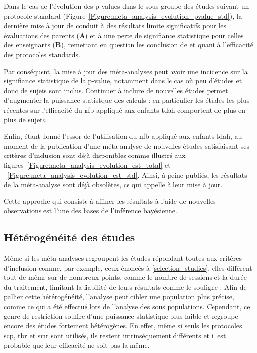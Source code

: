 \begin{itemize}
Dans le cas de l'évolution des p-values dans le sous-groupe des études suivant un protocole standard (Figure~\ref{Figure:meta_analysis_evolution_pvalue_std}), la dernière mise à jour 
de \citet{Cortese2016} conduit à des résultats limite significatifs pour les évaluations des parents (\textbf{A}) et à une perte de signifiance statistique pour celles des 
enseignants (\textbf{B}), remettant en question les conclusion de \citet{Cortese2016} et \citet{Bussalb2019clinical} quant à l'efficacité des protocoles standards.

Par conséquent, la mise à jour des méta-analyses peut avoir une incidence sur la signifiance statistique de la p-value, notamment dans le cas où peu d'études et donc de sujets
sont inclus. Continuer à inclure de nouvelles études permet d'augmenter la puissance statistque des calculs : en particulier les études les plus récentes sur l'efficacité du \gls{nfb}
appliqué aux enfants \gls{tdah} comportent de plus en plus de sujets.

Enfin, étant donné l'essor de l'utilisation du \gls{nfb} appliqué aux enfants \gls{tdah}, au moment de la publication d'une méta-analyse de nouvelles études satisfaisant ses critères d'inclusion
sont déjà disponibles comme illustré aux figures~\ref{Figure:meta_analysis_evolution_est_total} et ~\ref{Figure:meta_analysis_evolution_est_std}. Ainsi, à peine publiés, les résultats de la 
méta-analyse sont déjà obsolètes, ce qui appelle à leur mise à jour. 

Cette approche qui consiste à affiner les résultats à l'aide de nouvelles observations est l'une des bases de l'inférence bayésienne.

\subsection{Hétérogénéité des études} 

Même si les méta-analyses regroupent les études répondant toutes aux critères d'inclusion comme, par exemple, ceux énoncés à \ref{selection_studies}, 
elles diffèrent tout de même sur de nombreux points, comme le nombre de sessions et la durée du traitement, limitant la fiabilité de leurs résultats 
comme le souligne \citep{Alkoby2017}. Afin de pallier 
cette hétérogénéité, l'analyse peut cibler une population plus précise, comme ce qui a été effectué lors de l'analyse
des sous populations. Cependant, ce genre de restriction souffre d'une puissance statistique plus faible et regroupe encore des études fortement hétérogènes.
En effet, même si seuls les protocoles \gls{scp}, \gls{tbr} et \gls{smr} sont utilisés, ils restent intrinsèquement différents et il est probable que leur
efficacité ne soit pas la même. 


\end{itemize}
